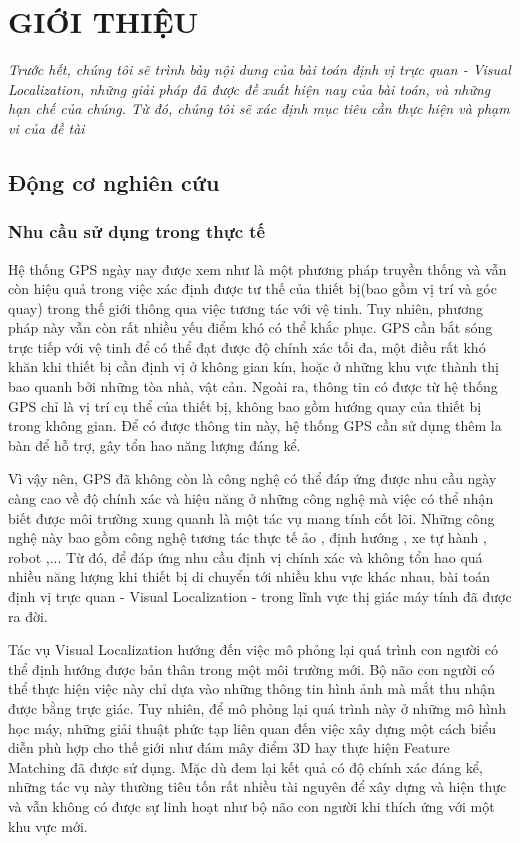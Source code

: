 \chapter{GIỚI THIỆU}

\textit{Trước hết, chúng tôi sẽ trình bày nội dung của bài toán định vị trực quan - Visual Localization, những giải pháp đã được đề xuất hiện nay của bài toán, và những hạn chế của chúng. Từ đó, chúng tôi sẽ xác định mục tiêu cần thực hiện và phạm vi của đề tài}

\section{Động cơ nghiên cứu}

\subsection{Nhu cầu sử dụng trong thực tế}

Hệ thống GPS ngày nay được xem như là một phương pháp truyền thống và vẫn còn hiệu quả trong việc xác định được tư thế của thiết bị(bao gồm vị trí và góc quay) trong thế giới thông qua việc tương tác với vệ tinh. Tuy nhiên, phương pháp này vẫn còn rất nhiều yếu điểm khó có thể khắc phục. GPS cần bắt sóng trực tiếp với vệ tinh để có thể đạt được độ chính xác tối đa, một điều rất khó khăn khi thiết bị cần định vị ở không gian kín, hoặc ở những khu vực thành thị bao quanh bởi những tòa nhà, vật cản. Ngoài ra, thông tin có được từ hệ thống GPS chỉ là vị trí cụ thể của thiết bị, không bao gồm hướng quay của thiết bị trong không gian. Để có được thông tin này, hệ thống GPS cần sử dụng thêm la bàn để hỗ trợ, gây tổn hao năng lượng đáng kể.

Vì vậy nên, GPS đã không còn là công nghệ có thể đáp ứng được nhu cầu ngày càng cao về độ chính xác và hiệu năng ở những công nghệ mà việc có thể nhận biết được môi trường xung quanh là một tác vụ mang tính cốt lõi. Những công nghệ này bao gồm công nghệ tương tác thực tế ảo \cite{middelberg2014scalable}, định hướng \cite{sarlin2023orienternet}, xe tự hành \cite{chaabane2021end}, robot \cite{sunderhauf2015place},... Từ đó, để đáp ứng nhu cầu định vị chính xác và không tổn hao quá nhiều năng lượng khi thiết bị di chuyển tới nhiều khu vực khác nhau, bài toán định vị trực quan - Visual Localization - trong lĩnh vực thị giác máy tính đã được ra đời.

Tác vụ Visual Localization hướng đến việc mô phỏng lại quá trình con người có thể định hướng được bản thân trong một môi trường mới. Bộ não con người có thể thực hiện việc này chỉ dựa vào những thông tin hình ảnh mà mắt thu nhận được bằng trực giác. Tuy nhiên, để mô phỏng lại quá trình này ở những mô hình học máy, những giải thuật phức tạp liên quan đến việc xây dựng một cách biểu diễn phù hợp cho thế giới như đám mây điểm 3D hay thực hiện Feature Matching đã được sử dụng. Mặc dù đem lại kết quả có độ chính xác đáng kể, những tác vụ này thường tiêu tốn rất nhiều tài nguyên để xây dựng và hiện thực và vẫn không có được sự linh hoạt như bộ não con người khi thích ứng với một khu vực mới.

